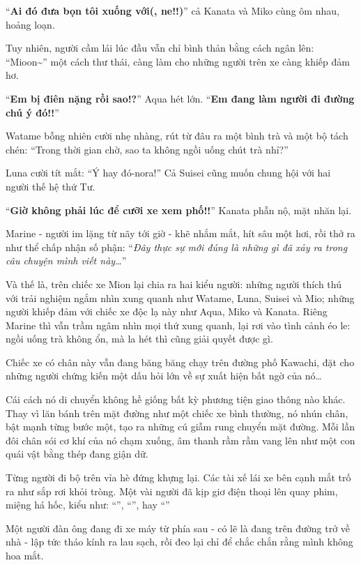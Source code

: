 \documentclass[../main.tex]{subfiles}
\begin{document}
``\textbf{Ai đó đưa bọn tôi xuống với(, ne!!)}'' cả Kanata và Miko cùng ôm nhau, hoảng loạn.

Tuy nhiên, người cầm lái lúc đầu vẫn chỉ bình thản bằng cách ngân lên: ``Mioon\~{}'' một cách thư thái, càng làm cho những người trên xe càng khiếp đảm hơ.

``\textbf{Em bị điên nặng rồi sao!?}'' Aqua hét lớn. ``\textbf{Em đang làm người đi đường chú ý đó!!}''

Watame bỗng nhiên cười nhẹ nhàng, rút từ đâu ra một bình trà và một bộ tách chén: ``Trong thời gian chờ, sao ta không ngồi uống chút trà nhỉ?''

Luna cười tít mắt: ``Ý hay đó-nora!'' Cả Suisei cũng muốn chung hội với hai người thế hệ thứ Tư.

``\textbf{Giờ không phải lúc để cưỡi xe xem phố!!}'' Kanata phẫn nộ, mặt nhăn lại.

Marine - người im lặng từ nãy tới giờ - khẽ nhắm mắt, hít sâu một hơi, rồi thở ra như thể chấp nhận số phận: ``\textit{Đây thực sự mới đúng là những gì đã xảy ra trong câu chuyện mình viết này\dots}''

Và thế là, trên chiếc xe Mion lại chia ra hai kiểu người: những người thích thú với trải nghiệm ngắm nhìn xung quanh như Watame, Luna, Suisei và Mio; những người khiếp đảm với chiếc xe độc lạ này như Aqua, Miko và Kanata. Riêng Marine thì vẫn trầm ngâm nhìn mọi thứ xung quanh, lại rơi vào tình cảnh éo le: ngồi uống trà không ổn, mà la hét thì cũng giải quyết được gì.

Chiếc xe có chân này vẫn đang băng băng chạy trên đường phố Kawachi, đặt cho những người chứng kiến một dấu hỏi lớn về sự xuất hiện bất ngờ của nó\dots

Cái cách nó di chuyển không hề giống bất kỳ phương tiện giao thông nào khác. Thay vì lăn bánh trên mặt đường như một chiếc xe bình thường, nó nhún chân, bật mạnh từng bước một, tạo ra những cú giẫm rung chuyển mặt đường. Mỗi lần đôi chân sói cơ khí của nó chạm xuống, âm thanh rầm rầm vang lên như một con quái vật bằng thép đang giận dữ.

Từng người đi bộ trên vỉa hè đứng khựng lại. Các tài xế lái xe bên cạnh mắt trố ra như sắp rơi khỏi tròng. Một vài người đã kịp giơ điện thoại lên quay phim, miệng há hốc, kiểu như: ``'', ``'', hay ``''

Một người đàn ông đang đi xe máy từ phía sau - có lẽ là đang trên đường trở về nhà - lập tức tháo kính ra lau sạch, rồi đeo lại chỉ để chắc chắn rằng mình không hoa mắt.
\end{document}
